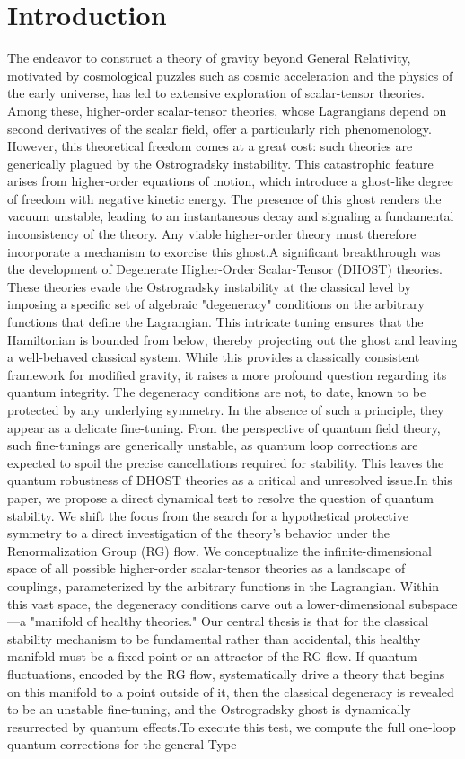 \documentclass[twocolumn]{aastex631}
\begin{document}
\section{Introduction}
\label{sec:intro}
The endeavor to construct a theory of gravity beyond General Relativity, motivated by cosmological puzzles such as cosmic acceleration and the physics of the early universe, has led to extensive exploration of scalar-tensor theories. Among these, higher-order scalar-tensor theories, whose Lagrangians depend on second derivatives of the scalar field, offer a particularly rich phenomenology. However, this theoretical freedom comes at a great cost: such theories are generically plagued by the Ostrogradsky instability. This catastrophic feature arises from higher-order equations of motion, which introduce a ghost-like degree of freedom with negative kinetic energy. The presence of this ghost renders the vacuum unstable, leading to an instantaneous decay and signaling a fundamental inconsistency of the theory. Any viable higher-order theory must therefore incorporate a mechanism to exorcise this ghost.A significant breakthrough was the development of Degenerate Higher-Order Scalar-Tensor (DHOST) theories. These theories evade the Ostrogradsky instability at the classical level by imposing a specific set of algebraic "degeneracy" conditions on the arbitrary functions that define the Lagrangian. This intricate tuning ensures that the Hamiltonian is bounded from below, thereby projecting out the ghost and leaving a well-behaved classical system. While this provides a classically consistent framework for modified gravity, it raises a more profound question regarding its quantum integrity. The degeneracy conditions are not, to date, known to be protected by any underlying symmetry. In the absence of such a principle, they appear as a delicate fine-tuning. From the perspective of quantum field theory, such fine-tunings are generically unstable, as quantum loop corrections are expected to spoil the precise cancellations required for stability. This leaves the quantum robustness of DHOST theories as a critical and unresolved issue.In this paper, we propose a direct dynamical test to resolve the question of quantum stability. We shift the focus from the search for a hypothetical protective symmetry to a direct investigation of the theory's behavior under the Renormalization Group (RG) flow. We conceptualize the infinite-dimensional space of all possible higher-order scalar-tensor theories as a landscape of couplings, parameterized by the arbitrary functions in the Lagrangian. Within this vast space, the degeneracy conditions carve out a lower-dimensional subspace---a "manifold of healthy theories." Our central thesis is that for the classical stability mechanism to be fundamental rather than accidental, this healthy manifold must be a fixed point or an attractor of the RG flow. If quantum fluctuations, encoded by the RG flow, systematically drive a theory that begins on this manifold to a point outside of it, then the classical degeneracy is revealed to be an unstable fine-tuning, and the Ostrogradsky ghost is dynamically resurrected by quantum effects.To execute this test, we compute the full one-loop quantum corrections for the general Type 
\end{document}

